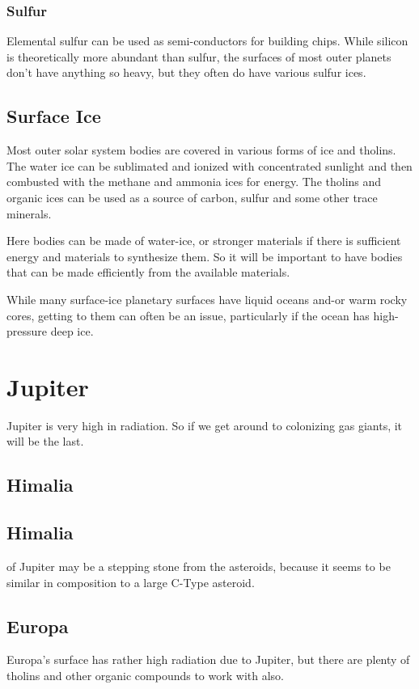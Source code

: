 \subsubsection{Sulfur}

Elemental sulfur can be used as semi-conductors for building chips. 
While silicon is theoretically more abundant than sulfur, the surfaces of most
outer planets don't have anything so heavy, but they often do have various
sulfur ices. 

\subsection{Surface Ice}
Most outer solar system bodies are covered in various forms of ice and tholins.
The water ice can be sublimated and ionized with concentrated sunlight and then
combusted with the methane and ammonia ices for energy. The tholins and organic
ices can be used as a source of carbon, sulfur and some other trace minerals. 

Here bodies can be made of water-ice, or stronger materials if there is
sufficient energy and materials to synthesize them. So it will be important to 
have bodies that can be made efficiently from the available materials.  

While many surface-ice planetary surfaces have 
liquid oceans and-or warm rocky cores, getting to them can often be an issue,
particularly if the ocean has high-pressure deep ice. 


\section{Jupiter}
Jupiter is very high in radiation.  So if we get around to colonizing gas
giants, it will be the last. 

\subsection{Himalia}

\subsection{Himalia} of Jupiter may be a stepping stone from the asteroids,
because it seems to be similar in composition to a large C-Type asteroid. 

\subsection{Europa}
Europa's surface has rather high radiation due to Jupiter, but there are plenty
of tholins and other organic compounds to work with also. 

